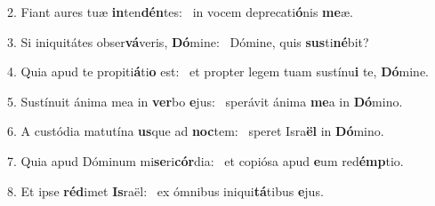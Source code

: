 2. Fiant aures tuæ \textbf{in}ten\textbf{dén}tes: \ast\  in vocem deprecati\textbf{ó}nis \textbf{me}æ.\

3. Si iniquitátes obser\textbf{vá}veris, \textbf{Dó}mine: \ast\  Dómine, quis \textbf{sus}ti\textbf{né}bit?\

4. Quia apud te propiti\textbf{á}ti\textbf{o} est: \ast\  et propter legem tuam sustínu\textbf{i} te, \textbf{Dó}mine.\

5. Sustínuit ánima mea in \textbf{ver}bo \textbf{e}jus: \ast\  sperávit ánima \textbf{me}a in \textbf{Dó}mino.\

6. A custódia matutína \textbf{us}que ad \textbf{noc}tem: \ast\  speret Isra\textbf{ël} in \textbf{Dó}mino.\

7. Quia apud Dóminum mi\textbf{se}ri\textbf{cór}dia: \ast\  et copiósa apud \textbf{e}um red\textbf{émp}tio.\

8. Et ipse \textbf{réd}imet \textbf{Is}raël: \ast\  ex ómnibus iniqui\textbf{tá}tibus \textbf{e}jus.\

